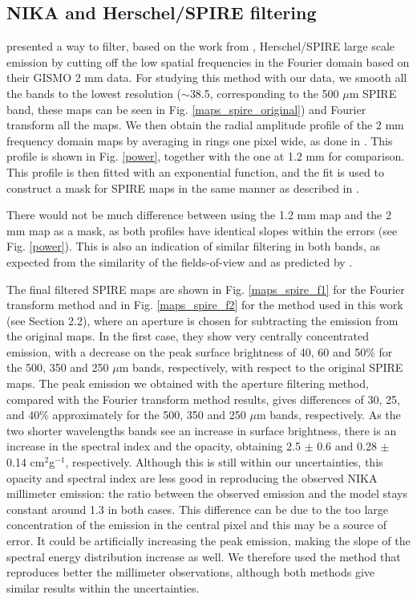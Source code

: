 \documentclass{aa}
\begin{document}
\begin{appendix}

\section{NIKA and Herschel/SPIRE filtering}

 presented a way to filter, based on the work from , Herschel/SPIRE large scale emission by cutting off the low spatial frequencies in the Fourier domain based on their GISMO 2 mm data. For studying this method with our data, we smooth all the bands to the lowest resolution ($\sim$38.5\arcsec, corresponding to the 500 $\mu$m SPIRE band, these maps can be seen in Fig. \ref{maps_spire_original}) and Fourier transform all the maps. We then obtain the radial amplitude profile of the 2 mm frequency domain maps by averaging in rings one pixel wide, as done in . This profile is shown in Fig. \ref{power}, together with the one at 1.2 mm for comparison. This profile is then fitted with an exponential function, and the fit is used to construct a mask for SPIRE maps in the same manner as described in .

There would not be much difference between using the 1.2 mm map and the 2 mm map as a mask, as both profiles have identical slopes within the errors (see Fig. \ref{power}). This is also an indication of similar filtering in both bands, as expected from the similarity of the fields-of-view and as predicted by . 

The final filtered SPIRE maps are shown in Fig. \ref{maps_spire_f1} for the Fourier transform method and in Fig. \ref{maps_spire_f2} for the method used in this work (see Section 2.2), where an aperture is chosen for subtracting the emission from the original maps. In the first case, they show very centrally concentrated emission, with a decrease on the peak surface brightness of 40, 60 and 50\% for the 500, 350 and 250 $\mu$m bands, respectively, with respect to the original SPIRE maps. The peak emission we obtained with the aperture filtering method, compared with the Fourier transform method results, gives differences of 30, 25, and 40\% approximately for the 500, 350 and 250 $\mu$m bands, respectively. As the two shorter wavelengths bands see an increase in surface brightness, there is an increase in the spectral index and the opacity, obtaining 2.5 $\pm$ 0.6 and 0.28 $\pm$ 0.14 cm$^2$g$^{-1}$, respectively. Although this is still within our uncertainties, this opacity and spectral index are less good in reproducing the observed NIKA millimeter emission: the ratio between the observed emission and the model stays constant around 1.3 in both cases. This difference can be due to the too large concentration of the emission in the central pixel and this may be a source of error. It could be artificially increasing the peak emission, making the slope of the spectral energy distribution increase as well. We therefore used the method that reproduces better the millimeter observations, although both methods give similar results within the uncertainties.


\end{appendix}
\end{document}
